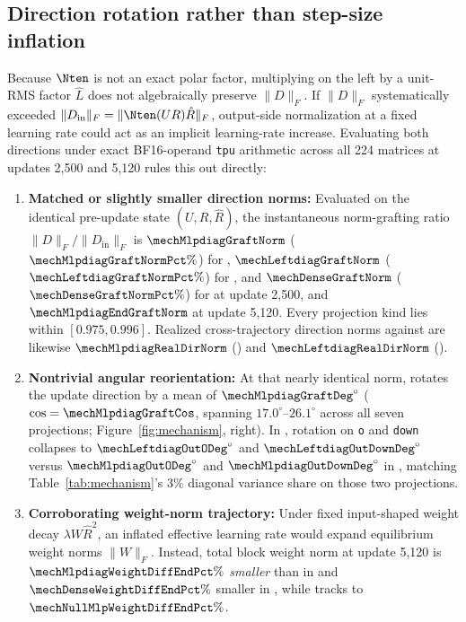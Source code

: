 \subsection{Direction rotation rather than step-size inflation}
\label{sec:mech-graft}

Because $\Nten$ is not an exact polar factor, multiplying on the left by a
unit-RMS factor $\hat L$ does not algebraically preserve $\|D\|_F$. If
$\|D\|_F$ systematically exceeded $\|D_{\text{in}}\|_F = \|\Nten(UR)\hat R\|_F$,
output-side normalization at a fixed learning rate could act as an implicit
learning-rate increase. Evaluating both directions under exact BF16-operand
\texttt{tpu} arithmetic across all 224 matrices at updates 2{,}500 and 5{,}120
rules this out directly:
\begin{enumerate}
\item \textbf{Matched or slightly smaller direction norms:} Evaluated on the
  identical pre-update state $(U,R,\hat R)$, the instantaneous norm-grafting
  ratio $\|D\|_F / \|D_{\text{in}}\|_F$ is $\mechMlpdiagGraftNorm$
  ($\mechMlpdiagGraftNormPct\%$) for \mlpdiag{}, $\mechLeftdiagGraftNorm$
  ($\mechLeftdiagGraftNormPct\%$) for \alldiag{}, and $\mechDenseGraftNorm$
  ($\mechDenseGraftNormPct\%$) for \dense{} at update 2{,}500, and
  $\mechMlpdiagEndGraftNorm$ at update 5{,}120. Every projection kind lies
  within $[0.975, 0.996]$. Realized cross-trajectory direction norms against
  \muont{} are likewise $\mechMlpdiagRealDirNorm$ (\mlpdiag{}) and
  $\mechLeftdiagRealDirNorm$ (\alldiag{}).
\item \textbf{Nontrivial angular reorientation:} At that nearly identical norm,
  \mlpdiag{} rotates the update direction by a mean of
  $\mechMlpdiagGraftDeg^\circ$ ($\cos = \mechMlpdiagGraftCos$, spanning
  $17.0^\circ$--$26.1^\circ$ across all seven projections; Figure~\ref{fig:mechanism},
  right). In \alldiag{}, rotation on \texttt{o} and \texttt{down} collapses to
  $\mechLeftdiagOutODeg^\circ$ and $\mechLeftdiagOutDownDeg^\circ$ versus
  $\mechMlpdiagOutODeg^\circ$ and $\mechMlpdiagOutDownDeg^\circ$ in \mlpdiag{},
  matching Table~\ref{tab:mechanism}'s $3\%$ diagonal variance share on those
  two projections.
\item \textbf{Corroborating weight-norm trajectory:} Under fixed input-shaped
  weight decay $\lambda W\hat R^2$, an inflated effective learning rate would
  expand equilibrium weight norms $\|W\|_F$. Instead, total block weight norm
  at update 5{,}120 is $\mechMlpdiagWeightDiffEndPct\%$ \emph{smaller} than
  \muont{} in \mlpdiag{} and $\mechDenseWeightDiffEndPct\%$ smaller in
  \dense{}, while \nullmlp{} tracks \muont{} to $\mechNullMlpWeightDiffEndPct\%$.
\end{enumerate}
